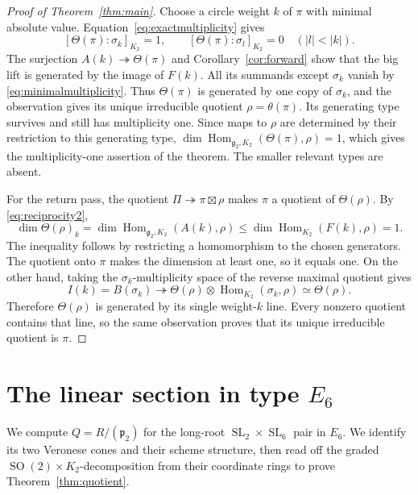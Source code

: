 \documentclass[11pt]{article}
\newcommand{\Hom}{\operatorname{Hom}}
\newcommand{\SL}{\operatorname{SL}}
\newcommand{\SO}{\operatorname{SO}}
\newcommand{\fg}{\mathfrak g}
\newcommand{\fp}{\mathfrak p}
\theoremstyle{definition}
\numberwithin{equation}{section}
\begin{document}
\begin{proof}[Proof of Theorem~\ref{thm:main}]
Choose a circle weight $k$ of $\pi$ with minimal absolute value.
Equation~\eqref{eq:exactmultiplicity} gives
\begin{equation}\label{eq:minimalmultiplicity}
 [\Theta(\pi):\sigma_k]_{K_2}=1,\qquad
 [\Theta(\pi):\sigma_l]_{K_2}=0\quad (|l|<|k|).
\end{equation}
The surjection $A(k)\twoheadrightarrow\Theta(\pi)$ and
Corollary~\ref{cor:forward} show that the big lift is generated by the
image of $F(k)$. All its summands except $\sigma_k$ vanish by
\eqref{eq:minimalmultiplicity}. Thus $\Theta(\pi)$ is generated by
one copy of $\sigma_k$, and the observation gives its unique irreducible
quotient $\rho=\theta(\pi)$. Its generating type survives and still
has multiplicity one. Since maps to $\rho$ are determined by their
restriction to this generating type, $\dim\Hom_{\fg_2,K_2}(\Theta(\pi),\rho)=1$,
which gives the multiplicity-one assertion of the theorem.
The smaller relevant types are absent.

For the return pass, the quotient
$\Pi\twoheadrightarrow\pi\boxtimes\rho$ makes $\pi$ a quotient of
$\Theta(\rho)$. By \eqref{eq:reciprocity2},
\[
 \dim\Theta(\rho)_k
   =\dim\Hom_{\fg_2,K_2}(A(k),\rho)
   \leq\dim\Hom_{K_2}(F(k),\rho)=1.
\]
The inequality follows by restricting a homomorphism to the chosen
generators. The quotient onto $\pi$ makes the dimension at least one,
so it equals one. On the other hand, taking the $\sigma_k$-multiplicity
space of the reverse maximal quotient gives
\[
 I(k)=B(\sigma_k)\twoheadrightarrow
 \Theta(\rho)\otimes\Hom_{K_2}(\sigma_k,\rho)
 \simeq\Theta(\rho).
\]
Therefore $\Theta(\rho)$ is generated by its single weight-$k$ line.
Every nonzero quotient contains that line, so the same observation
proves that its unique irreducible quotient is $\pi$.

\end{proof}

\section{The linear section in type \texorpdfstring{$E_6$}{E6}}\label{sec:e6}
We compute $Q=R/(\fp_2)$ for the long-root $\SL_2\times\SL_6$
pair in $E_6$. We identify its two Veronese cones and their scheme
structure, then read off the graded $\SO(2)\times K_2$-decomposition
from their coordinate rings to prove Theorem~\ref{thm:quotient}.
\end{document}
